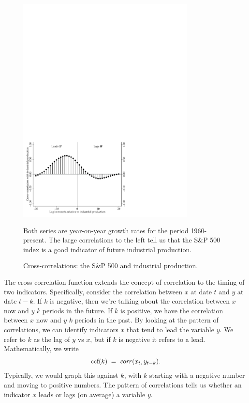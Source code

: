 \begin{figure}[h!]
    \caption{Cross-correlations: the S\&P 500 and industrial production.}
    \label{fig:ccf-sp500}%
    \centering
    \includegraphics[width=0.8\textwidth]{Figures/xcsp500.pdf}

    \begin{minipage}{0.8\textwidth}
    \footnotesize{Both series are year-on-year growth rates for the period
    1960-present.
    The large correlations to the left tell us that
    the S\&P 500 index is a good indicator of future industrial production.}
    \end{minipage}
\end{figure}

The cross-correlation function extends the concept of correlation
to the timing of two indicators.
Specifically, consider the correlation between $x$ at date $t$
and $y$ at date $t-k$.  If $k$ is negative,
then we're talking about the correlation
between $x$ now and $y$ $k$ periods in the future.
If $k$ is positive, we have the correlation between $x$ now and
$y$ $k$ periods in the past.
By looking at the pattern of correlations,
we can identify indicators $x$ that tend to lead the variable $y$.
We refer to $k$ as the lag of $y$ vs $x$,
but if $k$ is negative it refers to a lead.
Mathematically, we write
\[
    \mbox{ccf}(k) \;=\;  \mbox{\it corr\/} (x_t,y_{t-k}) .
\]
Typically, we would graph this against $k$, with $k$ starting
with a negative number and moving to positive numbers.
The pattern of correlations tells us whether an indicator $x$
leads or lags (on average) a variable $y$.


